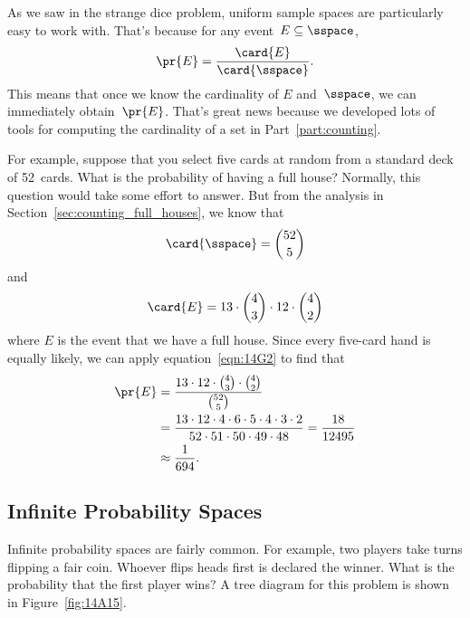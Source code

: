 As we saw in the strange dice problem, uniform sample spaces are
particularly easy to work with.  That's because for any event~$E
\subseteq \sspace$,
\begin{equation}\label{eqn:14G2}
    \pr{E} = \frac{\card{E}}{\card{\sspace}}.
\end{equation}
This means that once we know the cardinality of $E$ and~$\sspace$, we
can immediately obtain~$\pr{E}$.  That's great news because we
developed lots of tools for computing the cardinality of a set in
Part~\ref{part:counting}.

For example, suppose that you select five cards at random from a
standard deck of 52~cards.  What is the probability of having a full
house?  Normally, this question would take some effort to answer.  But
from the analysis in Section~\ref{sec:counting_full_houses}, we know
that
\begin{equation*}
    \card{\sspace} = \binom{52}{5}
\end{equation*}
and
\begin{equation*}
    \card{E} = 13 \cdot \binom{4}{3} \cdot 12 \cdot \binom{4}{2}
\end{equation*}
where $E$ is the event that we have a full house.  Since every
five-card hand is equally likely, we can apply
equation~\eqref{eqn:14G2} to find that
\begin{align*}
\pr{E}  &= \frac{13 \cdot 12 \cdot \binom{4}{3} \cdot \binom{4}{2}}
                {\binom{52}{5}} \\
        &= \frac{13 \cdot 12 \cdot 4 \cdot 6 \cdot 5 \cdot 4 \cdot 3 \cdot 2}
                {52 \cdot 51 \cdot 50 \cdot 49 \cdot 48} = \frac{18}{12495} \\
        &\approx \frac{1}{694}.
\end{align*}

\subsection{Infinite Probability Spaces}

\iffalse
General probability theory deals with uncountable sets like~$\reals$,
but in computer science, it is usually sufficient to restrict our
attention to countable probability spaces.  It's also a lot
easier ---infinite sample spaces are hard enough to work with without
having to deal with uncountable spaces.
\fi

Infinite probability spaces are fairly common.  For example, two
players take turns flipping a fair coin.  Whoever flips heads first is
declared the winner.  What is the probability that the first player
wins?  A tree diagram for this problem is shown in
Figure~\ref{fig:14A15}.

